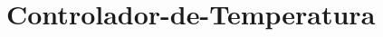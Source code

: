 \chapter[Controlador-de-Temperatura]{Controlador-de-Temperatura}
\label{cp:controlador-temperatura}
{

}
